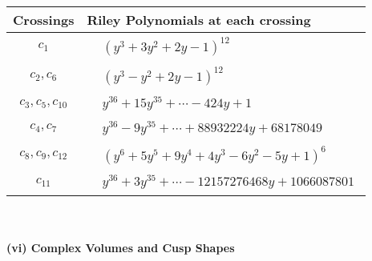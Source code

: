 \documentclass[1p]{elsarticle_modified}
\theoremstyle{definition}
\begin{document}
\begin{tabular}{m{50pt}|m{274pt}}
Crossings & \hspace{64pt}Riley Polynomials at each crossing \\
\hline $$\begin{aligned}c_{1}\end{aligned}$$&$\begin{aligned}
&(y^3+3 y^2+2 y-1)^{12}
\end{aligned}$\\
\hline $$\begin{aligned}c_{2},c_{6}\end{aligned}$$&$\begin{aligned}
&(y^3- y^2+2 y-1)^{12}
\end{aligned}$\\
\hline $$\begin{aligned}c_{3},c_{5},c_{10}\end{aligned}$$&$\begin{aligned}
&y^{36}+15 y^{35}+\cdots-424 y+1
\end{aligned}$\\
\hline $$\begin{aligned}c_{4},c_{7}\end{aligned}$$&$\begin{aligned}
&y^{36}-9 y^{35}+\cdots+88932224 y+68178049
\end{aligned}$\\
\hline $$\begin{aligned}c_{8},c_{9},c_{12}\end{aligned}$$&$\begin{aligned}
&(y^6+5 y^5+9 y^4+4 y^3-6 y^2-5 y+1)^6
\end{aligned}$\\
\hline $$\begin{aligned}c_{11}\end{aligned}$$&$\begin{aligned}
&y^{36}+3 y^{35}+\cdots-12157276468 y+1066087801
\end{aligned}$\\
\hline
\end{tabular}\\~\\
\newpage\flushleft \textbf{(vi) Complex Volumes and Cusp Shapes}
\end{document}
